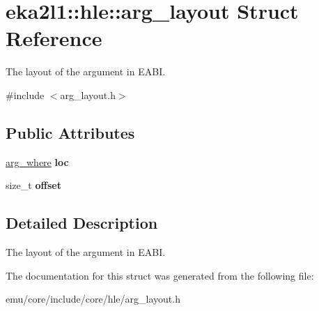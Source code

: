 \hypertarget{structeka2l1_1_1hle_1_1arg__layout}{}\section{eka2l1\+:\+:hle\+:\+:arg\+\_\+layout Struct Reference}
\label{structeka2l1_1_1hle_1_1arg__layout}


The layout of the argument in E\+A\+BI.  




{\ttfamily \#include $<$arg\+\_\+layout.\+h$>$}

\subsection*{Public Attributes}
\begin{DoxyCompactItemize}
\item 
\mbox{\label{structeka2l1_1_1hle_1_1arg__layout_a46ddb8f41973a7eb3cdd12e6045c5bad}} 
\mbox{\hyperlink{namespaceeka2l1_1_1hle_a4b57225b8d2741a5b0e9c0a5a594efb4}{arg\+\_\+where}} {\bfseries loc}
\item 
\mbox{\label{structeka2l1_1_1hle_1_1arg__layout_ace40e0b9a8cd85ca692057eb49ffe998}} 
size\+\_\+t {\bfseries offset}
\end{DoxyCompactItemize}


\subsection{Detailed Description}
The layout of the argument in E\+A\+BI. 

The documentation for this struct was generated from the following file\+:\begin{DoxyCompactItemize}
\item 
emu/core/include/core/hle/arg\+\_\+layout.\+h\end{DoxyCompactItemize}
